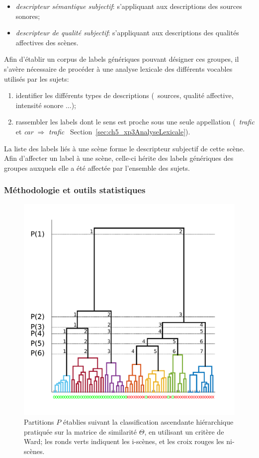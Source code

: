 \begin{itemize}
\item \emph{descripteur sémantique subjectif}: s'appliquant aux descriptions des sources sonores;
\item \emph{descripteur de qualité subjectif}: s'appliquant aux descriptions des  qualités affectives des scènes.
\end{itemize}

Afin d'établir un corpus de labels génériques pouvant désigner ces groupes, il s'avère nécessaire de procéder à une analyse lexicale des différents vocables utilisés par les sujets:

\begin{enumerate}
\item identifier les différents types de descriptions (\eg~sources, qualité affective, intensité sonore $\ldots$);
\item rassembler les labels dont le sens est proche sous une seule appellation (\eg~\emph{trafic} et \emph{car} $\Longrightarrow$ \emph{trafic} \cf~Section~\ref{sec:ch5_xp3AnalyseLexicale}).
\end{enumerate}

La liste des labels liés à une scène forme le descripteur subjectif de cette scène. Afin d'affecter un label à une scène, celle-ci hérite des labels génériques des groupes auxquels elle a été affectée par l'ensemble des sujets.

\subsubsection{Méthodologie et outils statistiques}

\begin{figure}[t]
        \myfloatalign
        \includegraphics[width=.8\linewidth]{gfx/ch_5/dendrogram}
        \caption[Partitions $P$ établies suivant la classification ascendante hiérarchique.]{Partitions $P$ établies suivant la classification ascendante hiérarchique pratiquée sur la matrice de similarité $\Theta$, en utilisant un critère de Ward; les ronds verts indiquent les i-scènes, et les croix rouges les ni-scènes.}\label{fig:dendrogram}
\end{figure}

